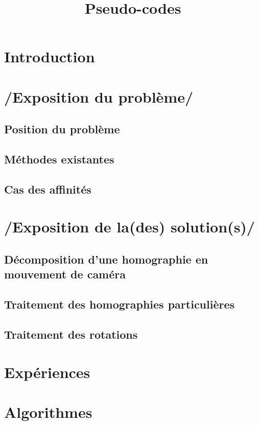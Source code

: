 \documentclass[a4paper,11pt]{article}
\title{Pseudo-codes}
\begin{document}
   	\maketitle
	\tableofcontents
	
	\section*{Introduction}
		
	\section{/Exposition du problème/}
		\subsection{Position du problème}
			
		\subsection{Méthodes existantes}
			
		\subsection{Cas des affinités}
	\section{/Exposition de la(des) solution(s)/}
		\subsection{Décomposition d'une homographie en mouvement de caméra}
		\subsection{Traitement des homographies particulières}
			
		\subsection{Traitement des rotations}
			
	\section{Expériences}
		
	\appendix
	\section{Algorithmes}
		
\end{document}

